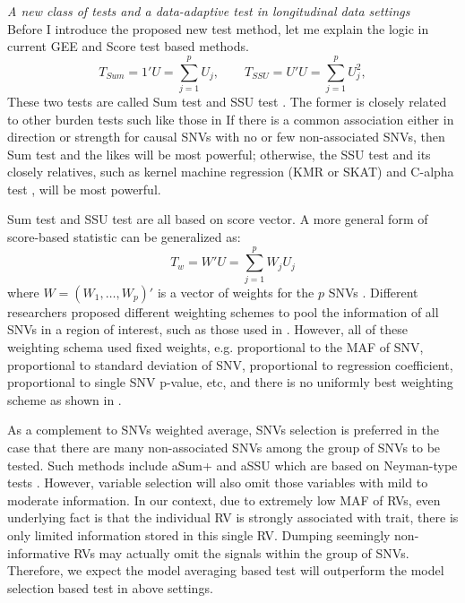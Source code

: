 \documentclass[12pt]{article}
\begin{document}
\textit{A new class of tests and a data-adaptive test in longitudinal data settings}\\
Before I introduce the proposed new test method, let me explain the logic in current GEE and Score test based methods.
$$
T_{Sum} = 1' U = \sum_{j=1}^p U_j, \qquad T_{SSU} = U'U = \sum_{j=1}^p U_j^2,
$$
These two tests are called Sum test and SSU test \cite{Pan2009}. The former is closely related to other burden tests such like those in \cite{Morgenthaler2007,Li2008,Madsen2009} If there is a common association either in direction or strength for causal SNVs with no or few non-associated SNVs, then Sum test and the likes will be most powerful; otherwise, the SSU test and its closely relatives, such as kernel machine regression (KMR or SKAT) \cite{Lee2012,Ionita-Laza2013,Oualkacha2013,Lee2012a,Wu2011} and C-alpha test \cite{Neale2011}, will be most powerful. 

Sum test and SSU test are all based on score vector. A more general form of score-based statistic can be generalized as:
$$
T_w = W' U = \sum_{j=1}^p W_j U_j
$$
where $W = (W_1, \ldots, W_p)'$ is a vector of weights for the $p$ SNVs \cite{Lin2011}. Different researchers proposed different weighting schemes to pool the information of all SNVs in a region of interest, such as those used in \cite{Madsen2009,Sul2011,Pan2011,Han2010,Li2008,Zhang2011,Lin2011,Basu2011}. However, all of these weighting schema used fixed weights, e.g. proportional to the MAF of SNV, proportional to standard deviation of SNV, proportional to regression coefficient, proportional to single SNV p-value, etc, and there is no uniformly best weighting scheme as shown in \cite{pan2014powerful,Basu2011,Pan2011}. 

As a complement to SNVs weighted average, SNVs selection is preferred in the case that there are many non-associated SNVs among the group of SNVs to be tested. Such methods include aSum+ and aSSU which are based on Neyman-type tests \cite{Neyman1937}. However, variable selection will also omit those variables with mild to moderate information. In our context, due to extremely low MAF of RVs, even underlying fact is that the individual RV is strongly associated with trait, there is only limited information stored in this single RV. Dumping seemingly non-informative RVs may actually omit the signals within the group of SNVs. Therefore, we expect the model averaging based test will outperform the model selection based test in above settings.
\end{document}
